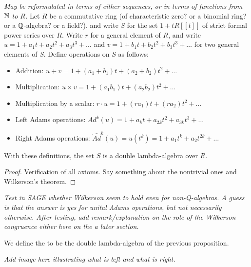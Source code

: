 \begin{proposition}
\emph{May be reformulated in terms of either sequences, or in terms of functions from $\mathbb{N}$ to $R$.}
Let $R$ be a commutative ring (of characteristic zero? or a binomial ring? or a $\mathbb{Q}$-algebra? or a field?), and write $S$ for the set $1+t R[[t]]$ of strict formal power series over $R$. Write $r$ for a general element of $R$, and write $u = 1+a_1 t + a_2 t^2 + a_3 t^3 + \ldots$ and $v = 1+b_1 t + b_2 t^2 + b_3 t^3 + \ldots$ for two general elements of $S$. Define operations on $S$ as follows:
\begin{itemize}
\item Addition: $u+v = 1+ (a_1 + b_1) t + (a_2 + b_2) t^2 + \ldots $
\item Multiplication: $u \times v = 1+ (a_1 b_1) t + (a_2  b_2) t^2 + \ldots$
\item Multiplication by a scalar: $r \cdot u = 1+ (r a_1 ) t + (r a_2 ) t^2 + \ldots$
\item Left Adams operations: $Ad^k(u) = 1 + a_k t + a_{2k} t^2 + a_{3k} t^3 + \ldots$
\item Right Adams operations: $\hat{Ad}^k(u) = u (t^k) = 1+a_1 t^k + a_2 t^{2k} + \ldots$
\end{itemize}
With these definitions, the set $S$ is a double lambda-algebra over $R$.
\end{proposition}

\begin{proof}
Verification of all axioms. Say something about the nontrivial ones and Wilkerson's theorem.
\end{proof}

\emph{Test in SAGE whether Wilkerson seem to hold even for non-Q-algebras. A guess is that the answer is yes for unital Adams operations, but not necessarily otherwise. After testing, add remark/explanation on the role of the Wilkerson congruence either here on the a later section.}

\begin{definition}
We define the  to be the double lambda-algebra of the previous proposition.
\end{definition}
 



\emph{Add image here illustrating what is left and what is right.}
